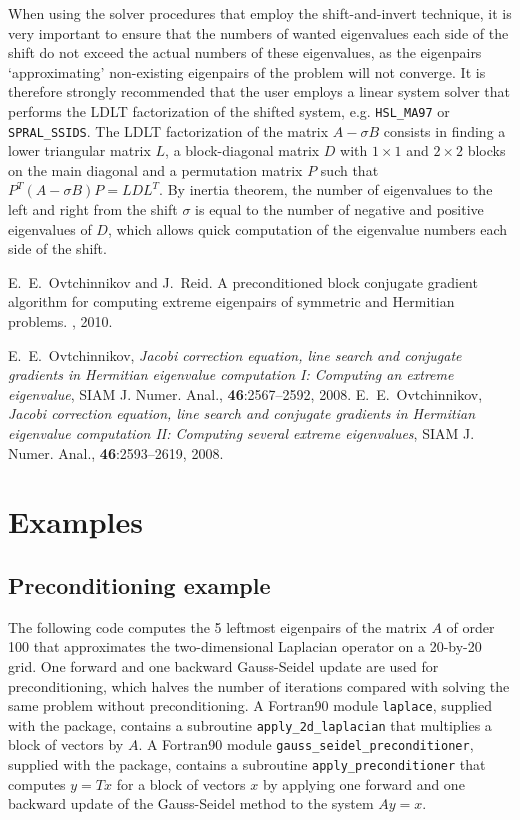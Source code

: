 When using the solver procedures that employ the shift-and-invert technique,
it is very important to ensure that the numbers of wanted eigenvalues
each side of the shift do not exceed the actual numbers of these eigenvalues,
as the eigenpairs `approximating' non-existing eigenpairs of the problem
will not converge.
It is therefore strongly recommended that the user employs 
a linear system solver that performs
the LDLT
factorization of %
the shifted system,
e.g. {\tt HSL\_MA97} or {\tt SPRAL\_SSIDS}.
The LDLT factorization of the matrix
$A - \sigma B$ consists in finding a lower triangular
matrix $L$, a block-diagonal matrix $D$
with $1\times 1$ and $2\times 2$ blocks on the main diagonal
and a permutation matrix $P$
such that $P^T(A - \sigma B)P = L D L^T$.
By inertia theorem,
the number of eigenvalues to the left and right from 
the shift $\sigma$
is equal to the number of negative and positive eigenvalues of $D$,
which allows quick computation of the eigenvalue numbers
each side of the shift. %


E.~E.~Ovtchinnikov and J.~Reid.
A preconditioned block conjugate gradient
algorithm for computing extreme eigenpairs
of symmetric and Hermitian problems.
\report, 2010.

E.~E.~Ovtchinnikov,
{\em Jacobi correction equation, line search and
conjugate gradients in Hermitian eigenvalue computation I:
Computing an extreme eigenvalue},
SIAM J. Numer. Anal., {\bf 46}:2567--2592, 2008.
E.~E.~Ovtchinnikov,
{\em Jacobi correction equation, line search and
conjugate gradients in Hermitian eigenvalue computation II:
Computing several extreme eigenvalues},
SIAM J. Numer. Anal., {\bf 46}:2593--2619, 2008.


\section{Examples}

\subsection{Preconditioning example}
\label{sec:ex.prec}

The following code 
computes the 5 leftmost eigenpairs of 
the matrix $A$ of order 100 that approximates 
the two-dimensional Laplacian operator
on a 20-by-20 grid.
One forward and one backward Gauss-Seidel update
are used for preconditioning,
which halves the number of iterations
compared with solving the same problem without preconditioning.
A Fortran90 module {\tt laplace}, supplied with the package,
contains a subroutine {\tt apply\_2d\_laplacian}
that multiplies a block of vectors by $A$.
A Fortran90 module {\tt gauss\_seidel\_preconditioner}, 
supplied with the package,
contains a subroutine {\tt apply\_preconditioner}
that computes $y = T x$ for a block of vectors $x$
by applying one forward and one backward update
of the Gauss-Seidel method to the system $A y = x$.

